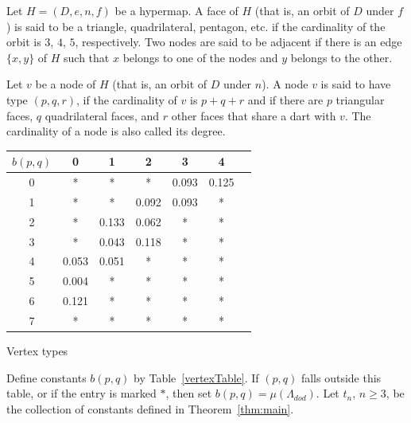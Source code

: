\documentclass{article} %
\begin{document}
Let $H=(D,e,n,f)$ be a hypermap.  A face of $H$ (that is, an orbit
of $D$ under $f$) is said to be a triangle, quadrilateral, pentagon, etc. if the cardinality
of the orbit is $3$, $4$, $5$, respectively.  Two nodes are said
to be adjacent
if there is an edge $\{x,y\}$ of $H$ such that $x$ belongs to one of the nodes and
$y$ belongs to the other.

  Let $v$ be a node of $H$ (that is, an orbit
of $D$ under $n$).  
A node $v$ is said to have type $(p,q,r)$, if the cardinality of $v$ is $p+q+r$ and if
there are $p$ triangular faces, $q$ quadrilateral faces, and $r$ other faces
that share a dart with $v$.  The cardinality of a node is also
called its degree.

\begin{Table}[h]
  \begin{center}
    \begin{tabular}{|c|c|c|c|c|c|c|} 
      \hline
      $b(p,q)$ & 0 & 1 & 2 & 3 & 4 \\
      \hline
      0 & * & * & * & 0.093 & 0.125  \\
      1 & * & * & 0.092 & 0.093 & *  \\
      2 & * & 0.133 & 0.062 & * & *  \\
      3 & * & 0.043 & 0.118 & * & *  \\
      4 & 0.053 & 0.051 & * & * & *  \\
      5 & 0.004 & * & * & * & *  \\
      6 & 0.121 & * & * & * & * \\
      7 & * & * & * & * & * \\
      \hline
    \end{tabular}
  \end{center}
  \caption{Vertex types}
  \label{vertexTable}
\end{Table}

Define constants $b(p,q)$ by Table~\ref{vertexTable}.
If $(p,q)$ falls outside this table, or if the entry is marked $*$, then
set $b(p,q)=\mu(\Lambda_{dod})$.
Let $t_n$, $n\ge3$, be the collection of constants defined in Theorem~\ref{thm:main}.
\end{document}
